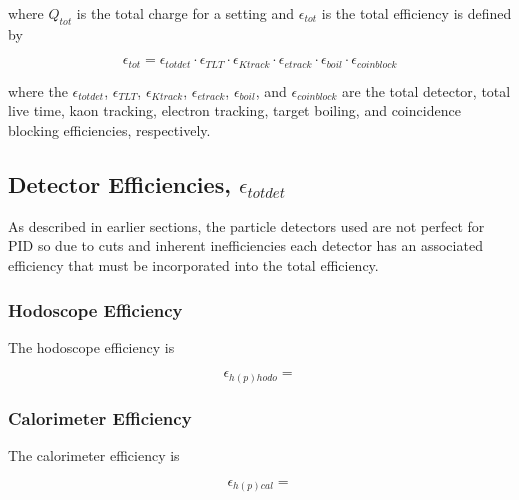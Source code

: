 \documentclass[
]{report}
\begin{document}
\noindent where \(Q_{tot}\) is the total charge for a setting and
\(\epsilon_{tot}\) is the total efficiency is defined by

\begin{equation} 
  \epsilon_{tot}=\epsilon_{tot det}\cdot\epsilon_{TLT}\cdot\epsilon_{K track}\cdot\epsilon_{e track}\cdot\epsilon_{boil}\cdot\epsilon_{coinblock}
  \label{eq:tot_eff} 
\end{equation}

\noindent where the \(\epsilon_{tot det}\), \(\epsilon_{TLT}\),
\(\epsilon_{K track}\), \(\epsilon_{e track}\), \(\epsilon_{boil}\), and
\(\epsilon_{coinblock}\) are the total detector, total live time, kaon
tracking, electron tracking, target boiling, and coincidence blocking
efficiencies, respectively.

\hypertarget{detector-efficiencies-epsilon_tot-det}{%
\subsection{\texorpdfstring{Detector Efficiencies,
\(\epsilon_{tot det}\)}{Detector Efficiencies, \textbackslash epsilon\_\{tot det\}}}\label{detector-efficiencies-epsilon_tot-det}}

As described in earlier sections, the particle detectors used are not
perfect for PID so due to cuts and inherent inefficiencies each detector
has an associated efficiency that must be incorporated into the total
efficiency.

\hypertarget{hodoscope-efficiency}{%
\subsubsection{Hodoscope Efficiency}\label{hodoscope-efficiency}}

The hodoscope efficiency is

\begin{equation} 
  \epsilon_{h(p)hodo}=
  \label{eq:hodo_eff} 
\end{equation}

\hypertarget{calorimeter-efficiency}{%
\subsubsection{Calorimeter Efficiency}\label{calorimeter-efficiency}}

The calorimeter efficiency is

\begin{equation} 
  \epsilon_{h(p)cal}=
  \label{eq:cal_eff} 
\end{equation}
\end{document}

